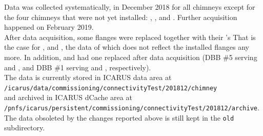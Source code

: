 Data was collected systematically, in December 2018 for all chimneys except
for the four chimneys that were not yet installed: ,
,  and . Further acquisition happened
on February 2019.
\\
After data acquisition, some flanges were replaced together with their \DBB's
That is the case for ,  and , the data
of which does not reflect the installed flanges any more.
In addition,  and  had one \DBB replaced after data
acquisition (DBB \#5 serving  and , and DBB \#1 serving
 and , respectively).
\\
The data is currently stored in ICARUS data area at \\
\texttt{/icarus/data/commissioning/connectivityTest/201812/chimney} \\
and archived in ICARUS dCache area at \\
\texttt{/pnfs/icarus/persistent/commissioning/connectivityTest/201812/archive}.\\
The data obsoleted by the changes reported above is still kept in the \texttt{old} subdirectory.



